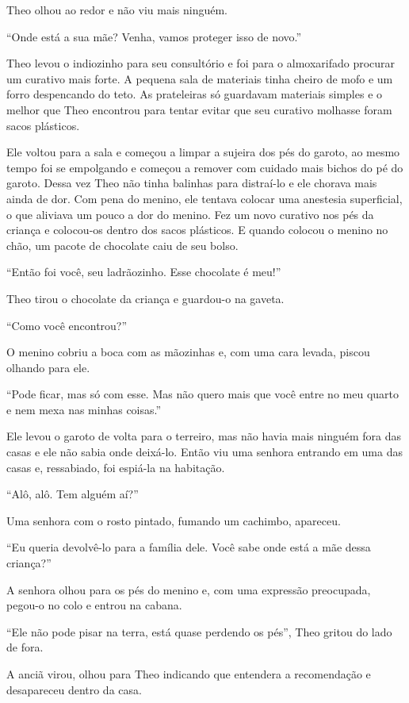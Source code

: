Theo olhou ao redor e não viu mais ninguém.

``Onde está a sua mãe? Venha, vamos proteger isso de novo.''

Theo levou o indiozinho para seu consultório e foi para o almoxarifado
procurar um curativo mais forte. A pequena sala de materiais tinha
cheiro de mofo e um forro despencando do teto. As prateleiras só
guardavam materiais simples e o melhor que Theo encontrou para tentar
evitar que seu curativo molhasse foram sacos plásticos.

Ele voltou para a sala e começou a limpar a sujeira dos pés do garoto,
ao mesmo tempo foi se empolgando e começou a remover com cuidado mais
bichos do pé do garoto. Dessa vez Theo não tinha balinhas para
distraí-lo e ele chorava mais ainda de dor. Com pena do menino, ele
tentava colocar uma anestesia superficial, o que aliviava um pouco a dor
do menino. Fez um novo curativo nos pés da criança e colocou-os dentro
dos sacos plásticos. E quando colocou o menino no chão, um pacote de
chocolate caiu de seu bolso.

``Então foi você, seu ladrãozinho. Esse chocolate é meu!''

Theo tirou o chocolate da criança e guardou-o na gaveta.

``Como você encontrou?''

O menino cobriu a boca com as mãozinhas e, com uma cara levada, piscou
olhando para ele.

``Pode ficar, mas só com esse. Mas não quero mais que você entre no meu
quarto e nem mexa nas minhas coisas.''

Ele levou o garoto de volta para o terreiro, mas não havia mais ninguém
fora das casas e ele não sabia onde deixá-lo. Então viu uma senhora
entrando em uma das casas e, ressabiado, foi espiá-la na habitação.

``Alô, alô. Tem alguém aí?''

Uma senhora com o rosto pintado, fumando um cachimbo, apareceu.

``Eu queria devolvê-lo para a família dele. Você sabe onde está a mãe
dessa criança?''

A senhora olhou para os pés do menino e, com uma expressão preocupada,
pegou-o no colo e entrou na cabana.

``Ele não pode pisar na terra, está quase perdendo os pés'', Theo gritou
do lado de fora.

A anciã virou, olhou para Theo indicando que entendera a recomendação e
desapareceu dentro da casa.


